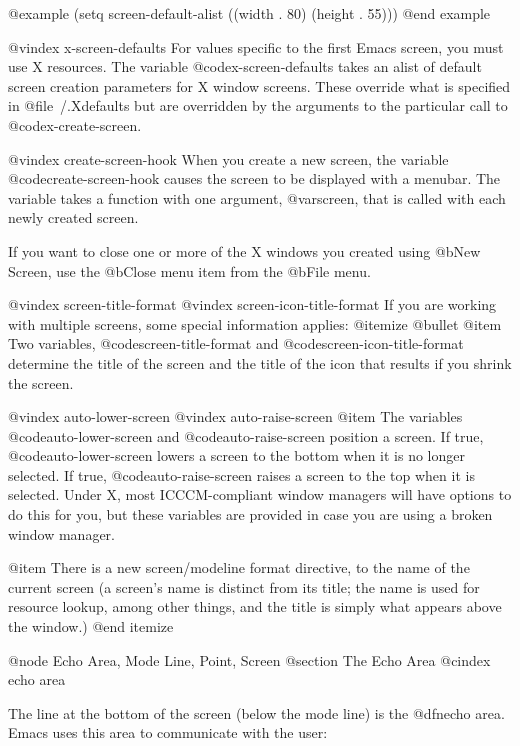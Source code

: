 @example
  (setq screen-default-alist ((width . 80) (height . 55)))
@end example

@vindex x-screen-defaults
For values specific to the first Emacs screen, you must use X resources.
The variable @code{x-screen-defaults} takes an alist of default screen
creation parameters for X window screens.  These override what is
specified in @file{~/.Xdefaults} but are overridden by the arguments to
the particular call to @code{x-create-screen}.

@vindex create-screen-hook
When you create a new screen, the variable @code{create-screen-hook}
causes the screen to be displayed with a menubar. The variable takes a
function with one argument, @var{screen}, that is called with each newly
created screen.

If you want to close one or more of the X windows you created using
@b{New Screen}, use the @b{Close} menu item from the @b{File} menu.  

@vindex screen-title-format
@vindex screen-icon-title-format
If you are working with multiple screens, some special information
applies:
@itemize @bullet
@item Two variables, @code{screen-title-format} and
@code{screen-icon-title-format} determine the title of the screen and the
title of the icon that results if you shrink the screen. 

@vindex auto-lower-screen
@vindex auto-raise-screen
@item The variables @code{auto-lower-screen} and
@code{auto-raise-screen} position a screen. If true,
@code{auto-lower-screen} lowers a screen to the bottom when it is no longer
selected. If true, @code{auto-raise-screen} raises a screen to
the top when it is selected. Under X, most ICCCM-compliant window managers
will have options to do this for you, but these variables are provided in
case you are using a broken window manager.

@item There is a new screen/modeline format directive, %
to the name of the current screen (a screen's name is distinct from its
title; the name is used for resource lookup, among other things, and the
title is simply what appears above the window.)
@end itemize


@node Echo Area, Mode Line, Point, Screen
@section The Echo Area
@cindex echo area

  The line at the bottom of the screen (below the mode line) is the
@dfn{echo area}.  Emacs uses this area to communicate with the user:

